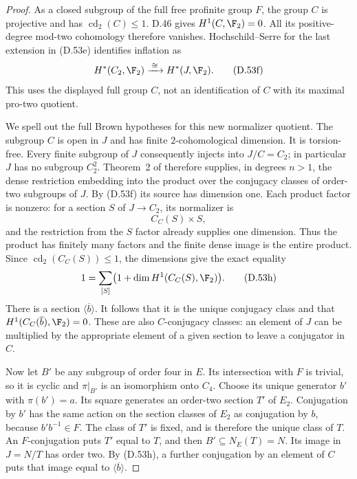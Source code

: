 \begin{proof}
As a closed subgroup of the full free
profinite group $F$, the group $C$ is
projective and has $\operatorname{cd}_2(C)\leq1$.
D.46 gives $H^1(C,\F_2)=0$.
All its positive-degree mod-two cohomology
therefore vanishes.
Hochschild--Serre for the last extension
in (D.53e) identifies inflation as
\[
               H^*(C_2,\F_2)\xrightarrow{\;\cong\;}
                                  H^*(J,\F_2).         \tag{D.53f}
\]
This uses the displayed full group $C$,
not an identification of $C$ with its
maximal pro-two quotient.

We spell out the full Brown hypotheses
for this new normalizer quotient.
The subgroup $C$ is open in $J$ and has
finite $2$-cohomological dimension.
It is torsion-free. Every finite subgroup
of $J$ consequently injects into $J/C=C_2$;
in particular $J$ has no subgroup $C_2^2$.
Theorem~2 of
\cite[\S1.1]{A-KochloukovaZalesskii2007}
therefore supplies, in degrees $n>1$,
the dense restriction embedding into the
product over the conjugacy classes of
order-two subgroups of $J$.
By (D.53f) its source has dimension one.
Each product factor is nonzero: for a
section $S$ of $J\to C_2$, its normalizer is
\[
                        C_C(S)\times S,
                                                               \tag{D.53g}
\]
and the restriction from the $S$ factor
already supplies one dimension.
Thus the product has finitely many
factors and the finite dense image is
the entire product.
Since $\operatorname{cd}_2(C_C(S))\leq1$,
the dimensions give the exact equality
\[
             1=\sum_{[S]}
                       \bigl(1+\dim H^1(C_C(S),\F_2)\bigr).
                                                               \tag{D.53h}
\]
There is a section $\langle\overline b\rangle$.
It follows that it is the unique
conjugacy class and that
$H^1(C_C(\overline b),\F_2)=0$.
These are also $C$-conjugacy classes:
an element of $J$ can be multiplied by
the appropriate element of a given
section to leave a conjugator in $C$.

Now let $B'$ be any subgroup of order
four in $E$. Its intersection with $F$
is trivial, so it is cyclic and $\pi|_{B'}$
is an isomorphism onto $C_4$.
Choose its unique generator $b'$ with
$\pi(b')=a$. Its square generates an
order-two section $T'$ of $E_2$.
Conjugation by $b'$ has the same action
on the section classes of $E_2$ as
conjugation by $b$, because
$b'b^{-1}\in F$.
The class of $T'$ is fixed, and is
therefore the unique class of $T$.
An $F$-conjugation puts $T'$ equal to $T$,
and then $B'\subseteq N_E(T)=N$.
Its image in $J=N/T$ has order two.
By (D.53h), a further conjugation by
an element of $C$ puts that image equal
to $\langle\overline b\rangle$.


\end{proof}
